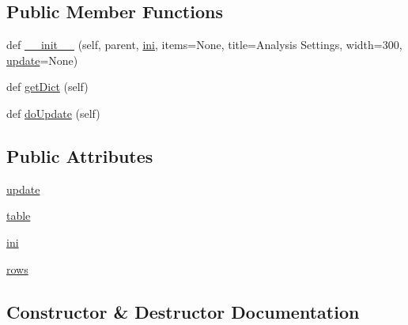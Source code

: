 \subsection*{Public Member Functions}
\begin{DoxyCompactItemize}
\item 
def \mbox{\hyperlink{classgetdist_1_1gui_1_1mainwindow_1_1DialogSettings_ad9f268447c886c66ca7025af4b317fbf}{\+\_\+\+\_\+init\+\_\+\+\_\+}} (self, parent, \mbox{\hyperlink{classgetdist_1_1gui_1_1mainwindow_1_1DialogSettings_a5eff370784314808c5cc2ece100d4615}{ini}}, items=None, title=\textquotesingle{}Analysis Settings\textquotesingle{}, width=300, \mbox{\hyperlink{classgetdist_1_1gui_1_1mainwindow_1_1DialogSettings_a6e90f00bde0b695ea4597b5b6bd41d46}{update}}=None)
\item 
def \mbox{\hyperlink{classgetdist_1_1gui_1_1mainwindow_1_1DialogSettings_af11876f1336ee99c94531fbe9c939775}{get\+Dict}} (self)
\item 
def \mbox{\hyperlink{classgetdist_1_1gui_1_1mainwindow_1_1DialogSettings_a92e4be448141585df9a341119d8d8ae6}{do\+Update}} (self)
\end{DoxyCompactItemize}
\subsection*{Public Attributes}
\begin{DoxyCompactItemize}
\item 
\mbox{\hyperlink{classgetdist_1_1gui_1_1mainwindow_1_1DialogSettings_a6e90f00bde0b695ea4597b5b6bd41d46}{update}}
\item 
\mbox{\hyperlink{classgetdist_1_1gui_1_1mainwindow_1_1DialogSettings_a2693087d5c876d3182d36725a8f32910}{table}}
\item 
\mbox{\hyperlink{classgetdist_1_1gui_1_1mainwindow_1_1DialogSettings_a5eff370784314808c5cc2ece100d4615}{ini}}
\item 
\mbox{\hyperlink{classgetdist_1_1gui_1_1mainwindow_1_1DialogSettings_ac5a86b53caa937116ae12c683f065308}{rows}}
\end{DoxyCompactItemize}


\subsection{Constructor \& Destructor Documentation}
\mbox{\label{classgetdist_1_1gui_1_1mainwindow_1_1DialogSettings_ad9f268447c886c66ca7025af4b317fbf}} 
